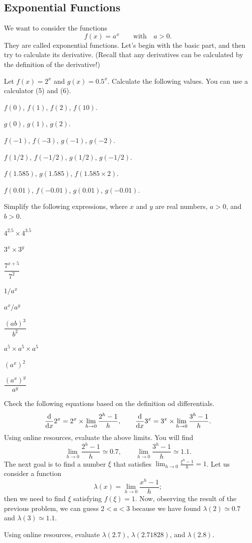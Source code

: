 \documentclass[11pt,pdfa,lastpage]{MishoNote}
\newcommand\starskip{\bigskip\begin{center}\pgfornament[width=7cm]{88}\end{center}\medskip}
\begin{document}
\newpage
\subsection{Exponential Functions}
We want to consider the functions
\[f(x)=a^x\qquad\text{with}\quad a>0.\]
They are called exponential functions.
Let's begin with the basic part, and then try to calculate its derivative.
(Recall that any derivatives can be calculated by the definition of the derivative!)

\starskip

\begin{enumerate}
  \itemA Let $f(x)=2^x$ and $g(x)=0.5^x$.  Calculate the following values. You can use a calculator  (5) and (6).
  \begin{menumerate}{2}
    \item $f(0)$, $f(1)$, $f(2)$, $f(10)$.
    \item $g(0)$, $g(1)$, $g(2)$.
    \item $f(-1)$, $f(-3)$, $g(-1)$, $g(-2)$.
    \item $f(1/2)$, $f(-1/2)$, $g(1/2)$, $g(-1/2)$.
    \item $f(1.585)$, $g(1.585)$, $f(1.585\times 2)$.
    \item $f(0.01)$, $f(-0.01)$, $g(0.01)$, $g(-0.01)$.
  \end{menumerate}
  \itemA Simplify the following expressions, where $x$ and $y$ are real numbers, $a>0$, and $b>0$.
  \begin{menumerate}{3}
    \item $4^{2.5}\times 4^{3.5}$
    \item $3^{x}\times 3^{y}$
    \item $\dfrac{7^{x+5}}{7^{2}}$
    \item $1/a^x$
    \item $a^x/a^y$
    \item $\dfrac{(ab)^3}{b^2}$
    \item $a^5\times a^5\times a^5$
    \item $(a^x)^2$
    \item $\dfrac{(a^x)^y}{a^y}$
  \end{menumerate}

 \itemB Check the following equations based on the definition od differentials.
\begin{equation*}
  \diff{}{x}2^x = 2^x\times\lim_{h\to 0}\frac{2^h-1}{h},\qquad
  \diff{}{x}3^x = 3^x\times\lim_{h\to 0}\frac{3^h-1}{h}.
\end{equation*}
\itemB Using online resources, evaluate the above limits. You will find
\[
  \lim_{h\to 0}\frac{2^h-1}{h}\simeq0.7, \qquad \lim_{h\to 0}\frac{3^h-1}{h}\simeq1.1.
\]
\itemC The next goal is to find a number $\xi$ that satisfies $\displaystyle\lim_{h\to 0}\frac{\xi^h-1}{h}=1$.
Let us consider a function \[ \lambda(x)=\lim_{h\to 0}\frac{x^h-1}{h};\]
then we need to find $\xi$ satisfying $f(\xi)=1$.
Now, observing the result of the previous problem, we can guess $2<a<3$ because we have found $\lambda(2)\simeq 0.7$ and $\lambda(3)\simeq1.1$.

Using online resources, evaluate $\lambda(2.7)$, $\lambda(2.71828)$, and $\lambda(2.8)$.
\end{enumerate}
\end{document}

